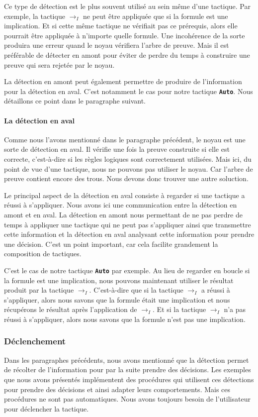 \documentclass[french,titlepage]{article}
\newcommand{\textttbf}[1]{\texttt{\textbf{#1}}}
\begin{document}
Ce type de détection est le plus souvent utilisé au sein même d'une tactique. Par exemple, la tactique $\to_I$ ne peut être appliquée que si la formule est une implication. Et si cette même tactique ne vérifiait pas ce prérequis, alors elle pourrait être appliquée à n'importe quelle formule. Une incohérence de la sorte produira une erreur quand le noyau vérifiera l'arbre de preuve. Mais il est préférable de détecter en amont pour éviter de perdre du temps à construire une preuve qui sera rejetée par le noyau.

La détection en amont peut également permettre de produire de l'information pour la détection en aval. C'est notamment le cas pour notre tactique \textttbf{Auto}. Nous détaillons ce point dans le paragraphe suivant.

\paragraph{La détection en aval} \label{realisation:detection_declenchement:detection:aval}
Comme nous l'avons mentionné dans le paragraphe précédent, le noyau est une sorte de détection en aval. Il vérifie une fois la preuve construite si elle est correcte, c'est-à-dire si les règles logiques sont correctement utilisées. Mais ici, du point de vue d'une tactique, nous ne pouvons pas utiliser le noyau. Car l'arbre de preuve contient encore des trous. Nous devons donc trouver une autre soluction.

Le principal aspect de la détection en aval consiste à regarder si une tactique a réussi à s'appliquer. Nous avons ici une communication entre la détection en amont et en aval. La détection en amont nous permettant de ne pas perdre de temps à appliquer une tactique qui ne peut pas s'appliquer ainsi que transmettre cette information et la détection en aval analysant cette information pour prendre une décision. C'est un point important, car cela facilite grandement la composition de tactiques.

C'est le cas de notre tactique \textttbf{Auto} par exemple. Au lieu de regarder en boucle si la formule est une implication, nous pouvons maintenant utiliser le résultat produit par la tactique $\to_I$. C'est-à-dire que si la tactique $\to_I$ a réussi à s'appliquer, alors nous savons que la formule était une implication et nous récupérons le résultat après l'application de $\to_I$. Et si la tactique $\to_I$ n'a pas réussi à s'appliquer, alors nous savons que la formule n'est pas une implication.

\subsubsection{Déclenchement} \label{realisation:detection_declenchement:declenchement}
Dans les paragraphes précédents, nous avons mentionné que la détection permet de récolter de l'information pour par la suite prendre des décisions. Les exemples que nous avons présentés implémentent des procédures qui utilisent ces détections pour prendre des décisions et ainsi adapter leurs comportements. Mais ces procédures ne sont pas automatiques. Nous avons toujours besoin de l'utilisateur pour déclencher la tactique.
\end{document}
